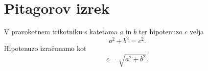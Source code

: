 \documentclass{article}
\begin{document}
\section*{Pitagorov izrek}
V pravokotnem trikotniku s katetama \(a\) in \(b\) ter hipotenuzo \(c\) velja
\[ a^2 + b^2 = c^2. \]
Hipotenuzo izračunamo kot
\[ c = \sqrt{a^2 + b^2}. \]
\end{document}
